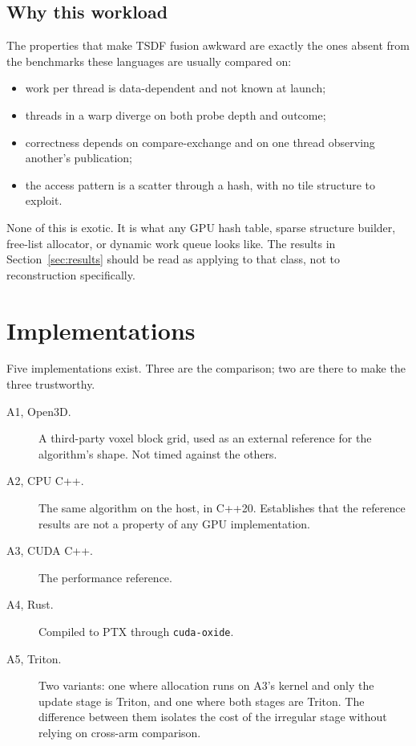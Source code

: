 \documentclass[11pt]{article}
\begin{document}
\subsection{Why this workload}

The properties that make TSDF fusion awkward are exactly the ones absent from
the benchmarks these languages are usually compared on:

\begin{itemize}
  \item work per thread is data-dependent and not known at launch;
  \item threads in a warp diverge on both probe depth and outcome;
  \item correctness depends on compare-exchange and on one thread observing
        another's publication;
  \item the access pattern is a scatter through a hash, with no tile structure
        to exploit.
\end{itemize}

None of this is exotic. It is what any GPU hash table, sparse structure builder,
free-list allocator, or dynamic work queue looks like. The results in
Section~\ref{sec:results} should be read as applying to that class, not to
reconstruction specifically.

\section{Implementations}
\label{sec:impl}

Five implementations exist. Three are the comparison; two are there to make the
three trustworthy.

\begin{description}
  \item[A1, Open3D.] A third-party voxel block grid, used as an external
        reference for the algorithm's shape. Not timed against the others.
  \item[A2, CPU C++.] The same algorithm on the host, in C++20. Establishes that
        the reference results are not a property of any GPU implementation.
  \item[A3, CUDA C++.] The performance reference.
  \item[A4, Rust.] Compiled to PTX through \texttt{cuda-oxide}.
  \item[A5, Triton.] Two variants: one where allocation runs on A3's kernel and
        only the update stage is Triton, and one where both stages are Triton.
        The difference between them isolates the cost of the irregular stage
        without relying on cross-arm comparison.
\end{description}
\end{document}
